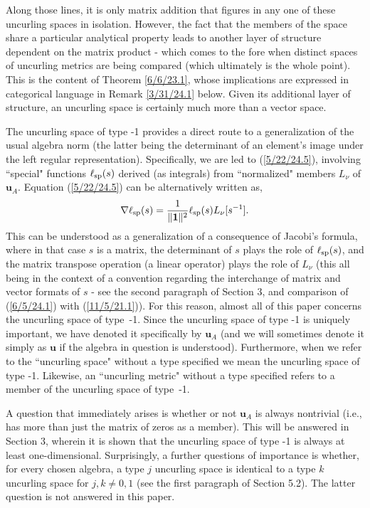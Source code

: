 \documentclass{amsart}
\numberwithin{equation}{section}
\theoremstyle{definition}
\numberwithin{theorem}{section}
\begin{document}
   Along those lines, it is only matrix addition that figures in any one of these uncurling spaces in isolation.  However, the fact that the members of the space share a particular analytical property leads to another layer of structure dependent on the matrix product - which comes to the fore when distinct spaces of uncurling metrics are being compared (which ultimately is the whole point).  This is the content of Theorem \ref{6/6/23.1}, whose implications are expressed in categorical language in Remark \ref{3/31/24.1} below. Given its additional layer of structure, an uncurling space is certainly much more than a vector space.
   
 The uncurling space of type -1 provides a direct route to a generalization of the usual algebra norm (the latter being the determinant of an element's image under the left regular representation).  Specifically, we are led to (\ref{5/22/24.5}),  involving ``special" functions $\ell_{\rm sp}(s)$ derived (as integrals) from ``normalized" members $L_\nu$ of $\mathbf{u}_A$. Equation (\ref{5/22/24.5}) can be alternatively written as,  \begin{equation}\label{6/5/24.1} \nabla\ell_{\rm sp}(s) = \frac{1}{\|\mathbf{1}\|^{2}}\ell_{\rm sp}(s) L_{\nu}[s^{-1}].\end{equation} This can be understood as a generalization of a consequence of Jacobi's formula, where in that case $s$ is a matrix, the determinant of $s$ plays the role of $\ell_{\rm sp}(s)$, and the matrix transpose operation (a linear operator) plays the role of $L_\nu$ (this all being in the context of a convention regarding the interchange of matrix and vector formats of $s$  -  see the second paragraph of Section 3, and comparison of (\ref{6/5/24.1}) with (\ref{11/5/21.1})).
   For this reason, almost all of this paper concerns the uncurling space of \mbox{type -1}. Since the uncurling space of type -1 is uniquely important, we have denoted it specifically by $\mathbf{u}_A$ (and we will sometimes denote it simply as $\mathbf{u}$ if the algebra in question is understood).    Furthermore, when we refer to the ``uncurling space" without a type specified we mean the uncurling space of type -1.  Likewise, an ``uncurling metric" without a type specified refers to a member of the uncurling space of \mbox{type -1}. 
 
A question that immediately arises is whether or not $\mathbf{u}_A$ is always nontrivial (i.e., has more than just the matrix of zeros as a member).  This will be answered in Section 3, wherein it is shown that the uncurling space of type -1 is always at least one-dimensional.  Surprisingly, a further questions of importance is whether, for every chosen algebra, a type $j$ uncurling space is identical to a type $k$ uncurling space for $j,k\ne 0,1$ (see the first paragraph of Section 5.2).  The latter question is not answered in this paper.
      
\end{document}
